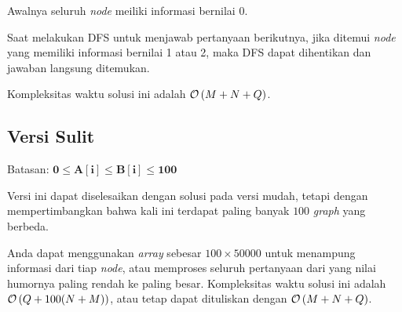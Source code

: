 \documentclass[../main_editorial.tex]{subfiles} %
\newcommand{\tnode}{\textit{node}\xspace}
\begin{document}
Awalnya seluruh \tnode meiliki informasi bernilai 0.

Saat melakukan DFS untuk menjawab pertanyaan berikutnya, jika ditemui \tnode yang memiliki informasi bernilai 1 atau 2, maka DFS dapat dihentikan dan jawaban langsung ditemukan.

Kompleksitas waktu solusi ini adalah $\mathcal{O}\left( M + N + Q \right)$.

\subsection*{Versi Sulit}

Batasan: $\mathbf{0 \le A[i] \le B[i] \le 100}$

Versi ini dapat diselesaikan dengan solusi pada versi mudah, tetapi dengan mempertimbangkan bahwa kali ini terdapat paling banyak $100$ \textit{graph} yang berbeda.

Anda dapat menggunakan \textit{array} sebesar $100 \times 50000$ untuk menampung informasi dari tiap \tnode, atau memproses seluruh pertanyaan dari yang nilai humornya paling rendah ke paling besar. Kompleksitas waktu solusi ini adalah $\mathcal{O}\left( Q + 100(N + M) \right)$, atau tetap dapat dituliskan dengan $\mathcal{O}\left( M + N + Q \right)$.
\end{document}
